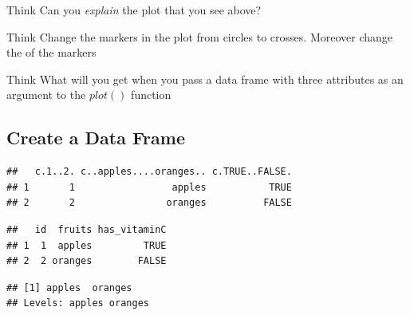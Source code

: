 \begin{DIY}{Think}
Can you \emph{explain} the plot that you see above?
\end{DIY}

\begin{DIY}{Think}
Change the markers in the plot from circles to crosses. Moreover change the of the markers
\end{DIY}

\begin{DIY}{Think}
What will you get when you pass a data frame with three attributes as an argument to the $plot()$ function
\end{DIY}

\subsection{Create a Data Frame}
\begin{knitrout}
\color{fgcolor}\begin{kframe}
\begin{alltt}
\hlkwb{<-}\hlstd{(}\hlstd{(}\hlstd{,}\hlstd{),}\hlstd{(}\hlstd{,}\hlstd{),}
              \hlstd{(}\hlstd{,}\hlstd{))}  
\end{alltt}
\begin{verbatim}
##   c.1..2. c..apples....oranges.. c.TRUE..FALSE.
## 1       1                 apples           TRUE
## 2       2                oranges          FALSE
\end{verbatim}
\begin{alltt}
\hlkwb{<-}\hlstd{(}\hlstd{,}\hlstd{,}\hlstd{)} 
\end{alltt}
\begin{verbatim}
##   id  fruits has_vitaminC
## 1  1  apples         TRUE
## 2  2 oranges        FALSE
\end{verbatim}
\begin{alltt}
\hlopt{$}
\end{alltt}
\begin{verbatim}
## [1] apples  oranges
## Levels: apples oranges
\end{verbatim}
\end{kframe}
\end{knitrout}

